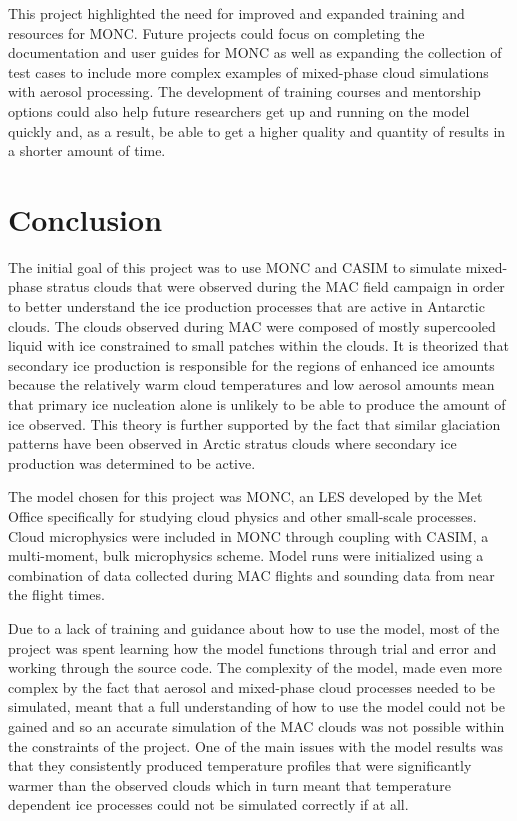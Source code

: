 This project highlighted the need for improved and expanded training and resources for MONC. Future projects could focus on completing the documentation and user guides for MONC as well as expanding the collection of test cases to include more complex examples of mixed-phase cloud simulations with aerosol processing. The development of training courses and mentorship options could also help future researchers get up and running on the model quickly and, as a result, be able to get a higher quality and quantity of results in a shorter amount of time.

\chapter{Conclusion} \label{ch:conclusion}
The initial goal of this project was to use MONC and CASIM to simulate mixed-phase stratus clouds that were observed during the MAC field campaign in order to better understand the ice production processes that are active in Antarctic clouds. The clouds observed during MAC were composed of mostly supercooled liquid with ice constrained to small patches within the clouds. It is theorized that secondary ice production is responsible for the regions of enhanced ice amounts because the relatively warm cloud temperatures and low aerosol amounts mean that primary ice nucleation alone is unlikely to be able to produce the amount of ice observed. This theory is further supported by the fact that similar glaciation patterns have been observed in Arctic stratus clouds where secondary ice production was determined to be active.

The model chosen for this project was MONC, an LES developed by the Met Office specifically for studying cloud physics and other small-scale processes. Cloud microphysics were included in MONC through coupling with CASIM, a multi-moment, bulk microphysics scheme. Model runs were initialized using a combination of data collected during MAC flights and sounding data from near the flight times. 

Due to a lack of training and guidance about how to use the model, most of the project was spent learning how the model functions through trial and error and working through the source code. The complexity of the model, made even more complex by the fact that aerosol and mixed-phase cloud processes needed to be simulated, meant that a full understanding of how to use the model could not be gained and so an accurate simulation of the MAC clouds was not possible within the constraints of the project. One of the main issues with the model results was that they consistently produced temperature profiles that were significantly warmer than the observed clouds which in turn meant that temperature dependent ice processes could not be simulated correctly if at all.

